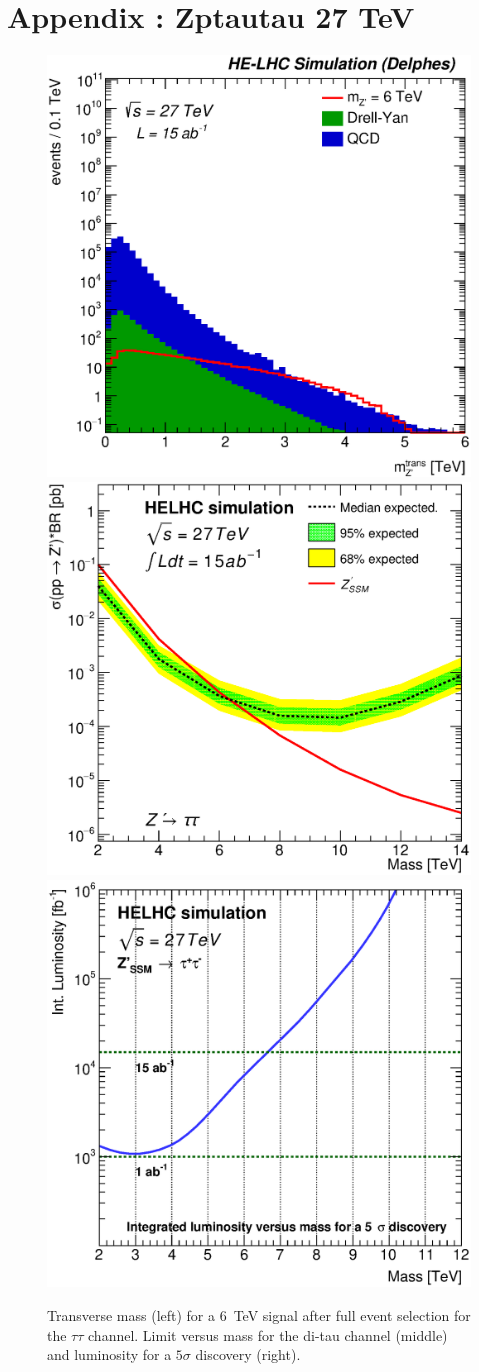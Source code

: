 \documentclass{cernrep}
\begin{document}
\clearpage
\newpage

\section{Appendix : Zptautau 27 TeV}
\label{appendix:zptautau27}

\begin{figure}[!htb]
  \centering
  \includegraphics[width=0.32\columnwidth]{Fig/27tev/Zptautau_mt_sel0_nostack_log.eps}
  \includegraphics[width=0.32\columnwidth]{Fig/27tev/lim_Zprime_tautau_helhc_v01.eps}
  \includegraphics[width=0.32\columnwidth]{Fig/27tev/DiscoveryPotential_tautau_rootStyle.eps}
  \caption{Transverse mass (left) for a 6~TeV signal after full event selection for the $\tau\tau$ channel. Limit versus mass for the di-tau channel (middle) and luminosity for a $5\sigma$ discovery (right).}
  \label{figure:leptonicresonances27:tautau}
\end{figure}
\end{document}
